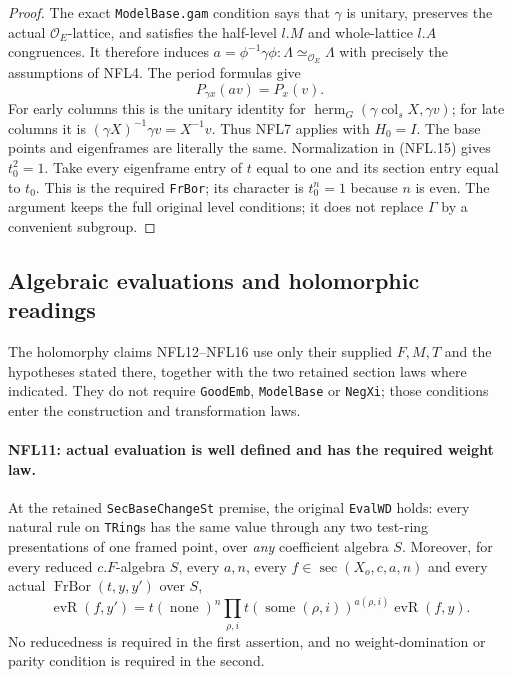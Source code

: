 \begin{proof}
The exact \texttt{ModelBase.gam} condition says that $\gamma$
is unitary, preserves the actual $\mathcal O_E$-lattice, and
satisfies the half-level $l.M$ and whole-lattice $l.A$ congruences.
It therefore induces
$a=\phi^{-1}\gamma\phi:\Lambda\simeq_{\mathcal O_E}\Lambda$
with precisely the assumptions of NFL4.  The period formulas
give
\[
 P_{\gamma x}(av)=P_x(v).
 \tag{NFL.21}
\]
For early columns this is the unitary identity for
$\operatorname{herm}_G(\gamma\operatorname{col}_sX,\gamma v)$;
for late columns it is $(\gamma X)^{-1}\gamma v=X^{-1}v$.
Thus NFL7 applies with $H_0=I$.  The base points and eigenframes
are literally the same.  Normalization in (NFL.15) gives
$t_0^2=1$.  Take every eigenframe entry of $t$ equal to one and
its section entry equal to $t_0$.  This is the required
\texttt{FrBor}; its character is $t_0^n=1$ because $n$ is even.
The argument keeps the full original level conditions; it does
not replace $\Gamma$ by a convenient subgroup.
\end{proof}

\subsection{Algebraic evaluations and holomorphic readings}

The holomorphy claims NFL12--NFL16 use only their supplied
$F,M,T$ and the hypotheses stated there, together with the two
retained section laws where indicated.  They do not require
\texttt{GoodEmb}, \texttt{ModelBase} or \texttt{NegXi}; those
conditions enter the construction and transformation laws.

\paragraph{NFL11: actual evaluation is well defined and has the required weight law.}
\label{claim:NFL11}
At the retained \texttt{SecBaseChangeSt} premise, the original
\texttt{EvalWD} holds: every natural rule on \texttt{TRing}s
has the same value through any two test-ring presentations of
one framed point, over \emph{any} coefficient algebra $S$.
Moreover, for every reduced $c.F$-algebra $S$, every $a,n$,
every $f\in\operatorname{sec}(X_o,c,a,n)$ and every actual
$\operatorname{FrBor}(t,y,y')$ over $S$,
\[
 \operatorname{evR}(f,y')
   =t(\operatorname{none})^n
       \prod_{\rho,i}t(\operatorname{some}(\rho,i))^{a(\rho,i)}
          \operatorname{evR}(f,y).
 \tag{NFL.22}
\]
No reducedness is required in the first assertion, and no
weight-domination or parity condition is required in the second.

